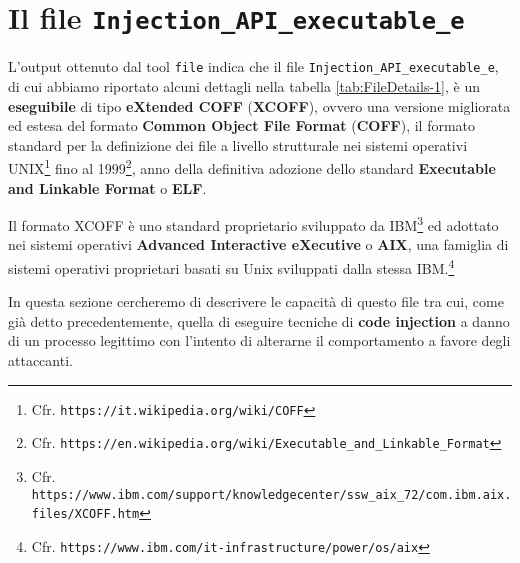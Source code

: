 \documentclass[10pt,a4paper, titlepage]{report}
\begin{document}
\section{Il file \texttt{Injection\_API\_executable\_e}}\label{sec:InjectionAPIExecutableE}

L'output ottenuto dal tool \texttt{file} indica che il file \texttt{Injection\_API\_executable\_e}, di cui abbiamo riportato alcuni dettagli nella tabella \ref{tab:FileDetails-1}, è un \textbf{eseguibile} di tipo \textbf{eXtended COFF} (\textbf{XCOFF}), ovvero una versione migliorata ed estesa del formato \textbf{Common Object File Format} (\textbf{COFF}), il formato standard per la definizione dei file a livello strutturale nei sistemi operativi UNIX\footnote{Cfr. \texttt{https://it.wikipedia.org/wiki/COFF}} fino al 1999\footnote{Cfr. \texttt{https://en.wikipedia.org/wiki/Executable\_and\_Linkable\_Format}}, anno della definitiva adozione dello standard \textbf{Executable and Linkable Format} o \textbf{ELF}.

Il formato XCOFF è uno standard proprietario sviluppato da IBM\footnote{Cfr. \texttt{https://www.ibm.com/support/knowledgecenter/ssw\_aix\_72/com.ibm.aix.files/XCOFF.htm}} ed adottato nei sistemi operativi \textbf{Advanced Interactive eXecutive} o \textbf{AIX}, una famiglia di sistemi operativi proprietari basati su Unix sviluppati dalla stessa IBM.\footnote{Cfr. \texttt{https://www.ibm.com/it-infrastructure/power/os/aix}}

In questa sezione cercheremo di descrivere le capacità di questo file tra cui, come già detto precedentemente, quella di eseguire tecniche di \textbf{code injection} a danno di un processo legittimo con l'intento di alterarne il comportamento a favore degli attaccanti. 
\end{document}

